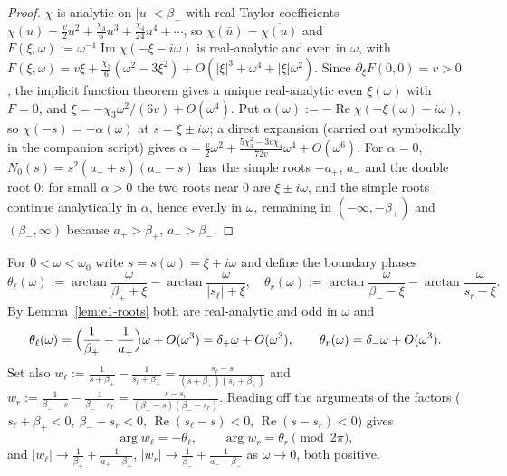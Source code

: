 \documentclass[11pt,a4paper]{article}
\theoremstyle{definition}
\theoremstyle{remark}
\newcommand{\1}{\mathbf 1}
\begin{document}
\begin{proof}
$\chi$ is analytic on $|u|<\beta_-$ with real Taylor coefficients
$\chi(u)=\frac v2u^2+\frac{\chi_3}6u^3+\frac{\chi_4}{24}u^4+\cdots$, so
$\chi(\bar u)=\overline{\chi(u)}$ and $F(\xi,\omega):=\omega^{-1}\operatorname{Im}\chi(-\xi-i\omega)$
is real-analytic and even in $\omega$, with
$F(\xi,\omega)=v\xi+\frac{\chi_3}{6}(\omega^2-3\xi^2)+O(|\xi|^3+\omega^4+|\xi|\omega^2)$.
Since $\partial_\xi F(0,0)=v>0$, the implicit function theorem gives a unique
real-analytic even $\xi(\omega)$ with $F=0$, and $\xi=-\chi_3\omega^2/(6v)+O(\omega^4)$.
Put $\alpha(\omega):=-\operatorname{Re}\chi(-\xi(\omega)-i\omega)$, so $\chi(-s)=-\alpha(\omega)$ at
$s=\xi\pm i\omega$; a direct expansion (carried out symbolically in the companion
script) gives $\alpha=\frac v2\omega^2+\frac{5\chi_3^2-3v\chi_4}{72v}\omega^4+O(\omega^6)$.
For $\alpha=0$, $N_0(s)=s^2(a_++s)(a_--s)$ has the simple roots $-a_+$, $a_-$ and
the double root $0$; for small $\alpha>0$ the two roots near $0$ are $\xi\pm i\omega$,
and the simple roots continue analytically in $\alpha$, hence evenly in $\omega$,
remaining in $(-\infty,-\beta_+)$ and $(\beta_-,\infty)$ because $a_+>\beta_+$, $a_->\beta_-$.
\end{proof}

For $0<\omega<\omega_0$ write $s=s(\omega)=\xi+i\omega$ and define the boundary phases
\begin{equation}\label{eq:e1-phases}
\theta_\ell(\omega):=\arctan\frac{\omega}{\beta_++\xi}-\arctan\frac{\omega}{|s_\ell|+\xi},
\quad
\theta_r(\omega):=\arctan\frac{\omega}{\beta_--\xi}-\arctan\frac{\omega}{s_r-\xi}.
\end{equation}
By Lemma~\ref{lem:e1-roots} both are real-analytic and odd in $\omega$ and
\begin{equation}\label{eq:e1-phase-exp}
\theta_\ell(\omega)=\Bigl(\frac1{\beta_+}-\frac1{a_+}\Bigr)\omega+O(\omega^3)=\delta_+\omega+O(\omega^3),
\qquad
\theta_r(\omega)=\delta_-\omega+O(\omega^3).
\end{equation}
Set also $w_\ell:=\frac1{s+\beta_+}-\frac1{s_\ell+\beta_+}=\frac{s_\ell-s}{(s+\beta_+)(s_\ell+\beta_+)}$ and
$w_r:=\frac1{\beta_--s}-\frac1{\beta_--s_r}=\frac{s-s_r}{(\beta_--s)(\beta_--s_r)}$.
Reading off the arguments of the factors ($s_\ell+\beta_+<0$, $\beta_--s_r<0$,
$\operatorname{Re}(s_\ell-s)<0$, $\operatorname{Re}(s-s_r)<0$) gives
\begin{equation}\label{eq:e1-args}
\arg w_\ell=-\theta_\ell,\qquad \arg w_r=\theta_r\pmod{2\pi},
\end{equation}
and $|w_\ell|\to\frac1{\beta_+}+\frac1{a_+-\beta_+}$, $|w_r|\to\frac1{\beta_-}+\frac1{a_--\beta_-}$
as $\omega\to0$, both positive.
\end{document}
